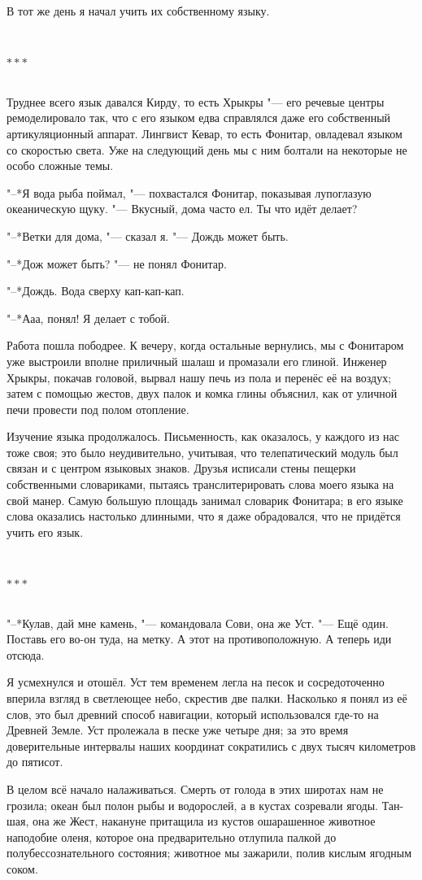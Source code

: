 \documentclass[a4paper,12pt,fleqn]{book}
\newcommand{\razd}{~\\{\centering\Large\bfseries$\ast \ast \ast$\par}~\\}
\begin{document}
В тот же день я начал учить их собственному языку.

\razd

Труднее всего язык давался Кирду, то есть Хрыкры "--- его речевые центры ремоделировало так, что с его языком едва справлялся даже его собственный артикуляционный аппарат.
Лингвист Кевар, то есть Фонитар, овладевал языком со скоростью света.
Уже на следующий день мы с ним болтали на некоторые не особо сложные темы.

"--*Я вода рыба поймал, "--- похвастался Фонитар, показывая лупоглазую океаническую щуку.
"--- Вкусный, дома часто ел.
Ты что идёт делает?

"--*Ветки для дома, "--- сказал я.
"--- Дождь может быть.

"--*Дож может быть? "--- не понял Фонитар.

"--*Дождь.
Вода сверху кап-кап-кап.

"--*Ааа, понял!
Я делает с тобой.

Работа пошла пободрее.
К вечеру, когда остальные вернулись, мы с Фонитаром уже выстроили вполне приличный шалаш и промазали его глиной.
Инженер Хрыкры, покачав головой, вырвал нашу печь из пола и перенёс её на воздух;
затем с помощью жестов, двух палок и комка глины объяснил, как от уличной печи провести под полом отопление.

Изучение языка продолжалось.
Письменность, как оказалось, у каждого из нас тоже своя;
это было неудивительно, учитывая, что телепатический модуль был связан и с центром языковых знаков.
Друзья исписали стены пещерки собственными словариками, пытаясь транслитерировать слова моего языка на свой манер.
Самую большую площадь занимал словарик Фонитара;
в его языке слова оказались настолько длинными, что я даже обрадовался, что не придётся учить его язык.

\razd

"--*Кулав, дай мне камень, "--- командовала Сови, она же Уст.
"--- Ещё один.
Поставь его во-он туда, на метку.
А этот на противоположную.
А теперь иди отсюда.

Я усмехнулся и отошёл.
Уст тем временем легла на песок и сосредоточенно вперила взгляд в светлеющее небо, скрестив две палки.
Насколько я понял из её слов, это был древний способ навигации, который использовался где-то на Древней Земле.
Уст пролежала в песке уже четыре дня;
за это время доверительные интервалы наших координат сократились с двух тысяч километров до пятисот.

В целом всё начало налаживаться.
Смерть от голода в этих широтах нам не грозила;
океан был полон рыбы и водорослей, а в кустах созревали ягоды.
Тан-шая, она же Жест, накануне притащила из кустов ошарашенное животное наподобие оленя, которое она предварительно отлупила палкой до полубессознательного состояния;
животное мы зажарили, полив кислым ягодным соком.
\end{document}
